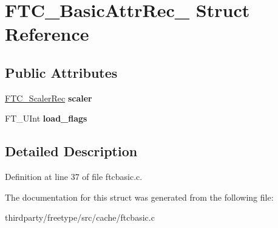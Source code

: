 \hypertarget{struct_f_t_c___basic_attr_rec__}{}\section{F\+T\+C\+\_\+\+Basic\+Attr\+Rec\+\_\+ Struct Reference}
\label{struct_f_t_c___basic_attr_rec__}
\subsection*{Public Attributes}
\begin{DoxyCompactItemize}
\item 
\mbox{\label{struct_f_t_c___basic_attr_rec___ab3359e99e0f59bcea12cc9170ad5c468}} 
\hyperlink{struct_f_t_c___scaler_rec__}{F\+T\+C\+\_\+\+Scaler\+Rec} {\bfseries scaler}
\item 
\mbox{\label{struct_f_t_c___basic_attr_rec___afd78c0b0721e52b4dd29caf52510a84d}} 
F\+T\+\_\+\+U\+Int {\bfseries load\+\_\+flags}
\end{DoxyCompactItemize}


\subsection{Detailed Description}


Definition at line 37 of file ftcbasic.\+c.



The documentation for this struct was generated from the following file\+:\begin{DoxyCompactItemize}
\item 
thirdparty/freetype/src/cache/ftcbasic.\+c\end{DoxyCompactItemize}
